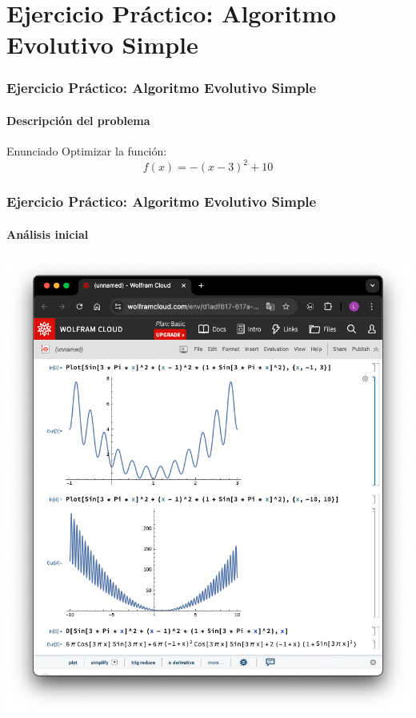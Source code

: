 \documentclass[
	11pt, %
]{beamer}
\begin{document}
\section{Ejercicio Práctico: Algoritmo Evolutivo Simple}
\begin{frame}
    \frametitle{Ejercicio Práctico: Algoritmo Evolutivo Simple}
    \framesubtitle{Descripción del problema}
    \begin{block}{Enunciado}
        Optimizar la función:
        \begin{equation*}
            f(x) = -(x - 3)^2 + 10
        \end{equation*}
    \end{block}
\end{frame}
\begin{frame}
    \frametitle{Ejercicio Práctico: Algoritmo Evolutivo Simple}
    \framesubtitle{Análisis inicial}
    \begin{center}
        \includegraphics[width=0.6\linewidth]{Images/Captura de pantalla 2024-10-23 a la(s) 6.45.02 p. m..png}
    \end{center}
\end{frame}
\end{document}
